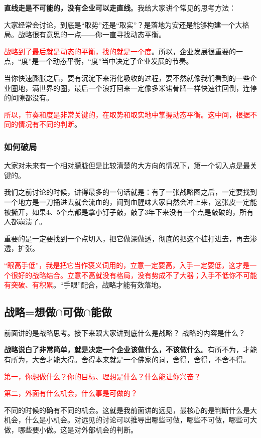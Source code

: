 \documentclass[12pt]{article}
\begin{document}
\textbf{直线走是不可能的，没有企业可以走直线}。我给大家讲个常见的思考方法：

大家经常会讨论，到底是“取势”还是“取实”？是落地为安还是能够构建一个大格局。战略很有意思的一点——你一直寻找动态平衡。

\textcolor{red}{战略到了最后就是动态的平衡，找的就是一个度}。所以，企业发展很重要的一点，“度”是一个动态平衡，“度”当中决定了企业发展的节奏。

当你快速膨胀之后，要有沉淀下来消化吸收的过程，要不然就像我们看到的一些企业圈地，满世界的圈，最后一个浪打回来一定像多米诺骨牌一样快速往回倒，连停的间隙都没有。

\textcolor{red}{所以，节奏和度是非常关键的，在取势和取实地中掌握动态平衡。这中间，根据不同的情况有不同的判断}。

\subsubsection{如何破局}
大家对未来有一个相对朦胧但是比较清楚的大方向的情况下，第一个切入点是最关键的。

我们之前讨论的时候，讲得最多的一句话就是：有了一张战略图之后，一定要找到一个地方是一刀捅进去就会流血的，闻到血腥味大家自然会冲上来，这张皮一定能被撕开，如果4、5个点都是拿小钉子敲，敲了3年下来没有一个点是敲破的，所有人都崩溃了。

重要的是一定要找到一个点切入，把它做深做透，彻底的把这个桩打进去，再去渗透，扩张。

\textcolor{red}{“眼高手低”，我是把它当作褒义词用的，立意一定要高，入手一定要低，这才是一个很好的战略结合。立意不高就没有格局，没有势成不了大器；入手不低你不可能有突破、有积累}。“手眼”配合，战略才能有效落地。

\subsection{战略=想做$\cap$可做$\cap$能做}
前面讲的是战略思考。接下来跟大家讲到底什么是战略？ 战略的内容是什么？

\textbf{战略说白了非常简单，就是决定一个企业该做什么，不该做什么}。有所不为，才能有所为，大舍才能大得。舍得本来就是一个佛家的词，舍得，舍得，不舍不得。

\textcolor{red}{第一，你想做什么？你的目标、理想是什么？什么能让你兴奋？ }

\textcolor{red}{第二，外面有什么机会，什么事是可做的？ }

不同的时候的确有不同的机会。这就是我前面讲的远见，最核心的是判断什么是大机会，什么是小机会。对远见的讨论可以推导出哪些可做，哪些不可做，哪些可大做，哪些要小做。这是对外部机会的判断。
\end{document}
